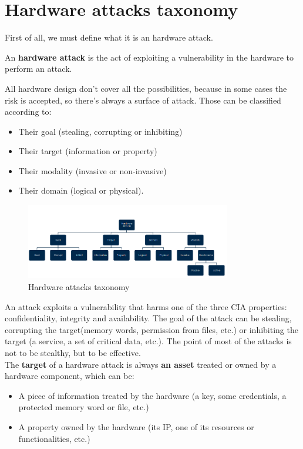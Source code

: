 \chapter{Hardware attacks taxonomy}
\label{ch:hw-attacks-taxonomy}
First of all, we must define what it is an hardware attack.
\begin{boxH}
  An \textbf{hardware attack} is the act of exploiting a vulnerability in the hardware to perform an
  attack.
\end{boxH}
All hardware design don't cover all the possibilities, because in some cases the risk is accepted,
so there's always a surface of attack. Those can be classified according to:
\begin{itemize}
  \item Their goal (stealing, corrupting or inhibiting)
  \item Their target (information or property)
  \item Their modality (invasive or non-invasive)
  \item Their domain (logical or physical).
\end{itemize}

\begin{figure}[H]
  \centering
  \includegraphics[width=0.8\textwidth]{img/hardware/hw attacks taxonomy.png}
  \caption{Hardware attacks taxonomy}
  \label{fig:hw-attacks-taxonomy}
\end{figure}

An attack exploits a vulnerability that harms one of the three CIA properties: confidentiality,
integrity and availability. The goal of the attack can be stealing, corrupting the target(memory
words, permission from files, etc.) or inhibiting the target (a service, a set of critical data, etc.).
The point of most of the attacks is not to be stealthy, but to be effective.\\
The \textbf{target} of a hardware attack is always \textbf{an asset} treated or owned by a hardware
component, which can be:
\begin{itemize}
  \item A piece of information treated by the hardware (a key, some credentials, a protected memory word
    or file, etc.)
  \item A property owned by the hardware (its IP, one of its resources or functionalities, etc.)
\end{itemize}

